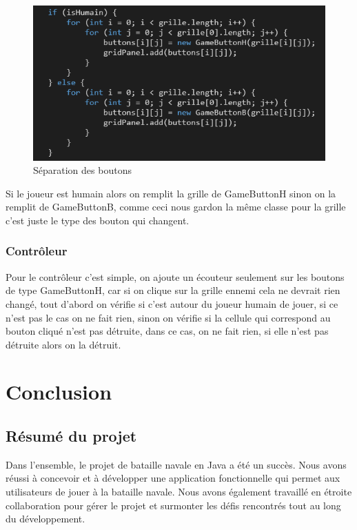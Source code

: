 \documentclass[12pt]{article}
\begin{document}
\begin{figure}[h]
\includegraphics[scale=1.2]{code.png}
\caption{Séparation des boutons}
\end{figure}


Si le joueur est humain alors on remplit la grille de GameButtonH sinon on la remplit de GameButtonB, comme ceci nous gardon la même classe pour la grille c'est juste le type des bouton qui changent.


\subsubsection{Contrôleur}
Pour le contrôleur c'est simple, on ajoute un écouteur seulement sur les boutons de type GameButtonH, car si on clique sur la grille ennemi cela ne devrait rien changé, tout d'abord on vérifie si c'est autour du joueur humain de jouer, si ce n'est pas le cas on ne fait rien, sinon on vérifie si la cellule qui correspond au bouton cliqué n'est pas détruite, dans ce cas, on ne fait rien, si elle n'est pas détruite alors on la détruit.

\newpage

\section{Conclusion}

\subsection{Résumé du projet}
Dans l'ensemble, le projet de bataille navale en Java a été un succès. Nous avons réussi à concevoir et à développer une application fonctionnelle qui permet aux utilisateurs de jouer à la bataille navale. Nous avons également travaillé en étroite collaboration pour gérer le projet et surmonter les défis rencontrés tout au long du développement.
\end{document}
